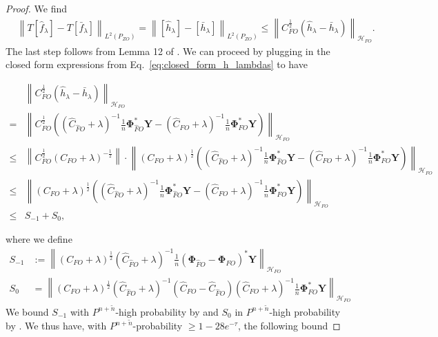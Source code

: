 \documentclass[11pt]{article}
\newcommand{\stageonesamples}{\tilde{n}}
\newcommand{\bY}{\mathbf Y}
\newcommand{\calH}{\mathcal{H}}
\newcommand{\0}{\mathbf{0}}
\newcommand{\bPhi}{\boldsymbol{\Phi}}
\begin{document}
\begin{appendix}
\begin{proof}
We find
\begin{align*}
    &\left\|T [\hat{f}_{\lambda}] - T [\bar{f}_{\lambda}] \right\|_{L^2(P_{ZO})} = \left\|[\hat{h}_{\lambda}] - [\bar{h}_{\lambda}] \right\|_{L^2(P_{ZO})} \leq \left\|C_{FO}^{\frac{1}{2}}\left(\hat{h}_{\lambda} - \bar{h}_{\lambda}\right)\right\|_{\calH_{FO}} .
\end{align*}
The last step follows from Lemma 12 of \cite{fischer2020sobolev}. We can proceed by plugging in the closed form expressions from Eq.~\eqref{eq:closed_form_h_lambdas} to have
\begin{small}
\begin{align*}
   &\left\|C_{FO}^{\frac{1}{2}}\left(\hat{h}_{\lambda} - \bar{h}_{\lambda}\right)\right\|_{\calH_{FO}}\\ = & \left\|C_{FO}^{\frac{1}{2}}\left(\left(\hat{C}_{\hat{F}O} + \lambda\right)^{-1}\frac{1}{n}\bPhi_{\hat{F}O}^{\ast}\bY - \left(\hat{C}_{FO} + \lambda\right)^{-1}\frac{1}{n}\bPhi_{FO}^{\ast}\bY\right)\right\|_{\calH_{FO}}\\
    \leq & \left\|C_{FO}^{\frac{1}{2}}(C_{FO} + \lambda)^{-\frac{1}{2}}\right\|\cdot \left\|(C_{FO} + \lambda)^{\frac{1}{2}}\left(\left(\hat{C}_{\hat{F}O} + \lambda\right)^{-1}\frac{1}{n}\bPhi_{\hat{F}O}^{\ast}\bY - \left(\hat{C}_{FO} + \lambda\right)^{-1}\frac{1}{n}\bPhi_{FO}^{\ast}\bY\right)\right\|_{\calH_{FO}}\\
    \leq & \left\|(C_{FO} + \lambda)^{\frac{1}{2}}\left(\left(\hat{C}_{\hat{F}O} + \lambda\right)^{-1}\frac{1}{n}\bPhi_{\hat{F}O}^{\ast}\bY - \left(\hat{C}_{FO} + \lambda\right)^{-1}\frac{1}{n}\bPhi_{FO}^{\ast}\bY\right)\right\|_{\calH_{FO}}\\
    \leq & S_{-1} + S_{0},
\end{align*}
\end{small}
where we define
\begin{align*}
    S_{-1} &:= \left\|(C_{FO} + \lambda)^{\frac{1}{2}}\left(\hat{C}_{\hat{F}O} + \lambda\right)^{-1} \frac{1}{n}\left(\bPhi_{\hat{F}O} - \bPhi_{FO}\right)^{\ast}\bY\right\|_{\calH_{FO}}\\
    S_0 &= \left\|(C_{FO} + \lambda)^{\frac{1}{2}}\left(\hat{C}_{\hat{F}O} + \lambda\right)^{-1}\left(\hat{C}_{FO} - \hat{C}_{\hat{F}O}\right) \left(\hat{C}_{FO} + \lambda\right)^{-1}\frac{1}{n}\bPhi_{FO}^{\ast}\bY\right\|_{\calH_{FO}}
\end{align*}
We bound $S_{-1}$ with $P^{n+\stageonesamples}$-high probability by  and $S_{0}$ in $P^{n+\stageonesamples}$-high probability by . We thus have, with $P^{n+\stageonesamples}$-probability $\geq 1 - 28e^{-\tau}$, the following bound

\end{proof}
\end{appendix}
\end{document}
